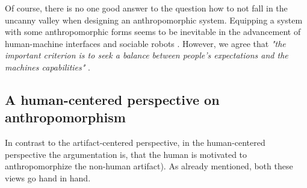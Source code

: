 \documentclass{frontiersSCNS} %
\begin{document}
 
Of course, there is no one good answer to the question how to not fall in the 
uncanny valley when designing an anthropomorphic system. Equipping a system with 
some anthropomorphic forms seems to be inevitable 
\cite{duffy_anthropomorphism_2002} in the advancement of human-machine interfaces 
and sociable robots \citep{breazeal_sociable_2000}. However, we agree that 
\textit{"the important criterion is to seek a balance between people's expectations 
and the machines capabilities"} \citep{duffy_anthropomorphism_2002}. 












%
%
%
%
%
%

\subsection{A human-centered perspective on anthropomorphism}
\label{sec:human-centered}

In contrast to the artifact-centered perspective, in the human-centered perspective the argumentation is, that the human is motivated to anthropomorphize the non-human artifact). As already mentioned, both these views go hand in hand.
\end{document}
